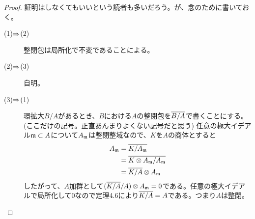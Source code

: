 \begin{proof}
  証明はしなくてもいいという読者も多いだろう。が、念のために書いておく。
  \begin{description}
    \item[(1)$\Rightarrow$(2)] 整閉包は局所化で不変であることによる。
    \item[(2)$\Rightarrow$(3)] 自明。
    \item[(3)$\Rightarrow$(1)] 環拡大$B/A$があるとき、$B$における$A$の整閉包を$\overline{B/A}$で書くことにする。(ここだけの記号。正直あんまりよくない記号だと思う) 任意の極大イデアル$\mathfrak{m} \subset A$について$A_{\mathfrak{m}}$は整閉整域なので、$K$を$A$の商体とすると
    \begin{align*}
      A_{\mathfrak{m}} &= \overline{K/ A_{\mathfrak{m}}} \\
      &= \overline{K \otimes A_{\mathfrak{m}} / A_{\mathfrak{m}}} \\
      &= \overline{K/A} \otimes A_{\mathfrak{m}}
    \end{align*}
    したがって、$A$加群として$(\overline{K/A} / A) \otimes  A_{\mathfrak{m}} = 0$である。任意の極大イデアルで局所化して$0$なので定理4.6により$\overline{K/A} =A$である。つまり$A$は整閉。
  \end{description}
\end{proof}


